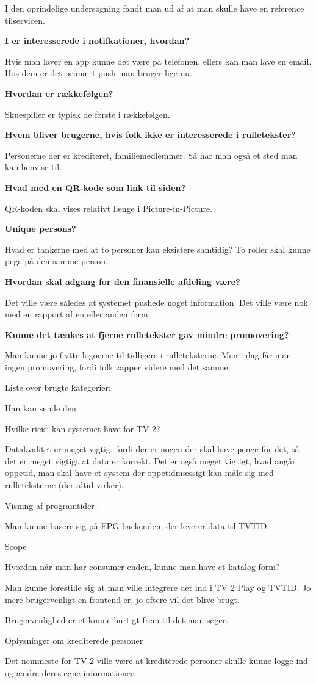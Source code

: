 I den oprindelige undersøgning fandt man ud af at man skulle have en reference tilservicen.

\textbf{I er interesserede i notifkationer, hvordan?}

Hvis man laver en app kunne det være på telefonen, ellers kan man lave en email. Hos dem er det primært push man bruger lige nu.

\textbf{Hvordan er rækkefølgen?}

Skuespiller er typisk de første i rækkefølgen.

\textbf{Hvem bliver brugerne, hvis folk ikke er interesserede i rulletekster?}

Personerne der er krediteret, familiemedlemmer. Så har man også et sted man kan henvise til.

\textbf{Hvad med en QR-kode som link til siden?}

QR-koden skal vises relativt længe i Picture-in-Picture.

\textbf{Unique persons?}

Hvad er tankerne med at to personer kan eksistere samtidig? To roller skal kunne pege på den samme person.

\textbf{Hvordan skal adgang for den finansielle afdeling være?}

Det ville være således at systemet pushede noget information. Det ville være nok med en rapport af en eller anden form.

\textbf{Kunne det tænkes at fjerne rulletekster gav mindre promovering?}

Man kunne jo flytte logoerne til tidligere i rulleteksterne. Men i dag får man ingen promovering, fordi folk zapper videre med det samme.

Liste over brugte kategorier:

Han kan sende den.

Hvilke ricisi kan systemet have for TV 2?

Datakvalitet er meget vigtig, fordi der er nogen der skal have penge for det, så det er meget vigtigt at data er korrekt. Det er også meget vigtigt, hvad angår oppetid, man skal have et system der oppetidmæssigt kan måle sig med rulleteksterne (der altid virker).

Visning af programtider

Man kunne basere sig på EPG-backenden, der leverer data til TVTID.

Scope

Hvordan når man har consumer-enden, kunne man have et katalog form?

Man kunne forestille sig at man ville integrere det ind i TV 2 Play og TVTID. Jo mere brugervenligt en frontend er, jo oftere vil det blive brugt.

Brugervenlighed er et kunne hurtigt frem til det man søger.

Oplysninger om krediterede personer

Det nemmeste for TV 2 ville være at krediterede personer skulle kunne logge ind og ændre deres egne informationer.
